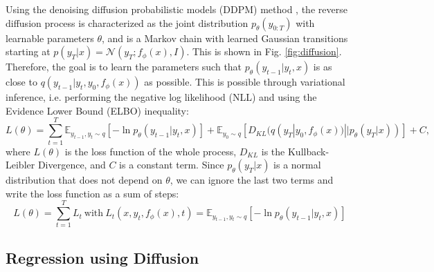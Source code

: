\documentclass{article}
\begin{document}
Using the denoising diffusion probabilistic models (DDPM) method \citep{ho2020denoising}, the reverse diffusion process is characterized as the joint distribution $p_\theta(y_{0:T})$ with learnable parameters $\theta$, and is a Markov chain with learned Gaussian transitions starting at $p(y_T|x) = \mathcal{N}(y_T;f_\phi(x),I)$. This is shown in Fig. \ref{fig:diffusion}. %
Therefore, the goal is to learn the parameters such that $p_\theta(y_{t-1}|y_t,x)$ is as close to $q(y_{t-1}|y_t,y_0,f_\phi(x))$ as possible. This is possible through variational inference, i.e. performing the negative log likelihood (NLL) and using the Evidence Lower Bound (ELBO) inequality:
\begin{equation}
  L(\theta) = \sum_{t=1}^T \mathbb{E}_{y_{t-1},y_t\sim q}\left[-\ln p_\theta(y_{t-1}|y_t,x) \right] + \mathbb{E}_{y_0\sim q}\left[ D_{KL}(q(y_T | y_0, f_\phi(x)) || p_\theta (y_T | x)) \right] + C,
\end{equation}
where $L(\theta)$ is the loss function of the whole process, $D_{KL}$ is the Kullback-Leibler Divergence, and $C$ is a constant term. Since $p_\theta(y_T|x)$ is a normal distribution that does not depend on $\theta$, we can ignore the last two terms and write the loss function as a sum of steps:
\begin{equation}\label{eqn:loss_final}
  L(\theta) = \sum_{t=1}^T L_t\ \text{with}\ L_t(x, y_t, f_\phi(x), t) = \mathbb{E}_{y_{t-1},y_t\sim q} \left[-\ln p_\theta(y_{t-1}|y_t,x) \right]
\end{equation}


\subsection{Regression using Diffusion}
\end{document}

